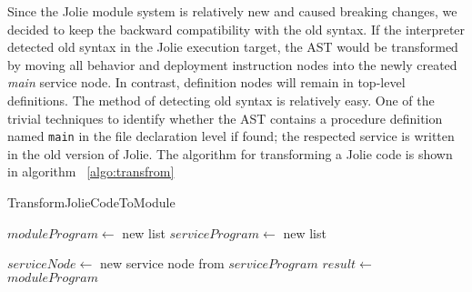 Since the Jolie module system is relatively new and caused breaking changes, we decided to keep the backward compatibility with the old syntax. If the interpreter detected old syntax in the Jolie execution target, the AST would be transformed by moving all behavior and deployment instruction nodes into the newly created \textit{main} service node. In contrast, definition nodes will remain in top-level definitions. The method of detecting old syntax is relatively easy. One of the trivial techniques to identify whether the AST contains a procedure definition named \texttt{main} in the file declaration level if found; the respected service is written in the old version of Jolie. The algorithm for transforming a Jolie code is shown in algorithm ~\ref{algo:transfrom}

\begin{algorithm}[ht]
    \caption{TransformJolieCodeToModule}
    \label{algo:transfrom}
    \begin{algorithmic}[1]

        \State $moduleProgram\gets$ new list
        \State $serviceProgram\gets$ new list

        \State {}
        \Else
        \State {}
        \EndIf
        \EndFor
        \State $serviceNode \gets$ new service node from $serviceProgram$
        \State {}
        \State $result \gets$ $moduleProgram$
        \EndProcedure

    \end{algorithmic}
\end{algorithm}

\FloatBarrier